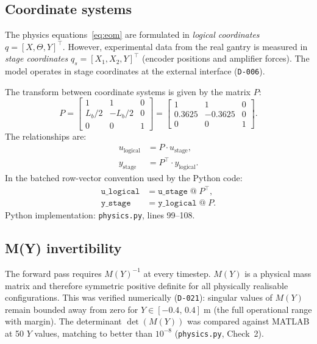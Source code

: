 \documentclass[11pt,a4paper]{article}
\newcommand{\inv}{^{-1}}
\newcommand{\T}{^{\!\top}}
\newcommand{\decref}[1]{\texttt{D-#1}}
\newcommand{\pyfile}[1]{\texttt{#1}}
\begin{document}
\subsection{Coordinate systems}
\label{sec:coords}

The physics equations~\eqref{eq:eom} are formulated in \emph{logical coordinates}
$q = [X, \Theta, Y]\T$. However, experimental data from the real gantry is measured in
\emph{stage coordinates} $q_s = [X_1, X_2, Y]\T$ (encoder positions and amplifier forces).
The model operates in stage coordinates at the external interface (\decref{006}).

The transform between coordinate systems is given by the matrix $P$:
\begin{equation}
\label{eq:P}
P = \begin{bmatrix}
1 & 1 & 0 \\
L_b/2 & -L_b/2 & 0 \\
0 & 0 & 1
\end{bmatrix}
= \begin{bmatrix}
1 & 1 & 0 \\
0.3625 & -0.3625 & 0 \\
0 & 0 & 1
\end{bmatrix}.
\end{equation}
The relationships are:
\begin{align}
u_{\text{logical}} &= P \cdot u_{\text{stage}}, \label{eq:u_transform} \\
y_{\text{stage}} &= P\T \cdot y_{\text{logical}}. \label{eq:y_transform}
\end{align}
In the batched row-vector convention used by the Python code:
\begin{align}
\texttt{u\_logical} &= \texttt{u\_stage} \;\texttt{@}\; P\T, \\
\texttt{y\_stage} &= \texttt{y\_logical} \;\texttt{@}\; P.
\end{align}
Python implementation: \pyfile{physics.py}, lines 99--108.

\subsection{M(Y) invertibility}
\label{sec:invertibility}

The forward pass requires $M(Y)\inv$ at every timestep. $M(Y)$ is a physical mass matrix and
therefore symmetric positive definite for all physically realisable configurations. This was
verified numerically (\decref{021}): singular values of $M(Y)$ remain bounded away from zero
for $Y \in [-0.4,\, 0.4]\;\text{m}$ (the full operational range with margin). The determinant
$\det(M(Y))$ was compared against MATLAB at 50 $Y$ values, matching to better than
$10^{-8}$ (\pyfile{physics.py}, Check~2).
\end{document}
